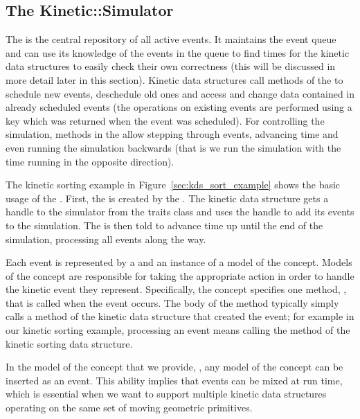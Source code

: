 \subsection{The Kinetic::Simulator\label{sec:kds_simulator}}


The  is the central repository of all active events.
It maintains the event queue and can use its knowledge of the events
in the queue to find times for the kinetic data structures to easily
check their own correctness (this will be discussed in more detail
later in this section). Kinetic data structures call methods of the
 to schedule new events, deschedule old ones and
access and change data contained in already scheduled events (the
operations on existing events are performed using a key which was
returned when the event was scheduled).  For controlling the
simulation, methods in the  allow stepping through
events, advancing time and even running the simulation backwards (that
is we run the simulation with the time running in the opposite
direction).

The kinetic sorting example in Figure~\ref{sec:kds_sort_example} shows the
basic usage of the . First, the 
is created by the . The kinetic data structure
gets a handle to the simulator from the traits class and uses the
handle to add its events to the simulation. The  is
then told to advance time up until the end of the simulation,
processing all events along the way.

Each event is represented by a  and an instance of a
model of the  concept.  Models of the 
concept are responsible for taking the appropriate action in order to
handle the kinetic event they represent.  Specifically, the
 concept specifies one method,
, that is called when the event occurs.
The body of the  method typically
simply calls a method of the kinetic data structure that created the
event; for example in our kinetic sorting example, processing an event
means calling the 
method of the kinetic sorting data structure.

In the model of the  concept that we provide,
, any model
of the  concept can be inserted as an
event. This ability implies that events can be mixed at run time,
which is essential when we want to support multiple kinetic data
structures operating on the same set of moving geometric primitives.

